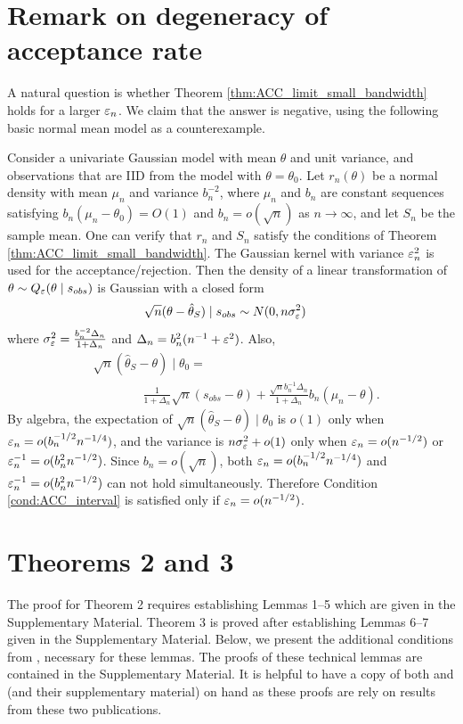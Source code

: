 \section{Remark on degeneracy of acceptance rate}\label{sec:degen_of_AR}
A natural question is whether Theorem \ref{thm:ACC_limit_small_bandwidth} holds for a larger $\varepsilon_n$. We claim that the answer is negative, using the following basic normal mean model as a counterexample.

Consider a univariate Gaussian model with mean $\theta$ and unit variance, and observations that are IID from the model with $\theta=\theta_0$. Let $r_{n}(\theta)$ be a normal density with mean $\mu_n$ and variance $b_n^{-2}$, where $\mu_n$ and $b_n$ are constant sequences satisfying $b_n(\mu_n-\theta_0)=O(1)$ and $b_n=o(\sqrt{n})$ as $n\rightarrow\infty$, and let $S_n$ be the sample mean. One can verify that $r_{n}$ and $S_n$ satisfy the conditions of Theorem \ref{thm:ACC_limit_small_bandwidth}. The Gaussian kernel with variance $\varepsilon_n^2$ is used for the acceptance/rejection. Then the density of a linear transformation of $\theta \sim Q_{\varepsilon}(\theta \mid s_{\relax obs})$ is Gaussian with a closed form  
\begin{align*}
\sqrt{n}(\theta-\hat{\theta}_{S}) \mid s_{obs} & \sim N(0,n\sigma_{\varepsilon}^{2})
\end{align*}
where $\sigma_{\varepsilon}^{2}=\frac{b_{n}^{-2}\Delta_{n}}{1+\Delta_{n}}$ and $\Delta_{n}=b_{n}^{2}(n^{-1}+\varepsilon^{2})$. Also,
\begin{align*}
&\sqrt{n}(\hat{\theta}_{S}-\theta) \mid \theta_0  = \qquad \qquad \qquad \qquad \qquad \qquad \\
&\qquad \qquad \frac{1}{1+\Delta_{n}}\sqrt{n}(s_{obs}-\theta)+\frac{\sqrt{n}b_{n}^{-1}\Delta_{n}}{1+\Delta_{n}}b_{n}(\mu_{n}-\theta).
\end{align*}
By algebra, the expectation of $\sqrt{n}(\hat{\theta}_{S}-\theta) \mid \theta_0$ is $o(1)$ only when $\varepsilon_n=o(b_{n}^{-1/2}n^{-1/4})$, and the variance is $n\sigma_{\varepsilon}^2+o(1)$ only when $\varepsilon_n=o(n^{-1/2})$ or $\varepsilon_n^{-1}=o(b_n^2n^{-1/2})$. Since $b_n=o(\sqrt{n})$, both $\varepsilon_n=o(b_{n}^{-1/2}n^{-1/4})$ and $\varepsilon_n^{-1}=o(b_n^2n^{-1/2})$ can not hold simultaneously. Therefore Condition \ref{cond:ACC_interval} is satisfied only if $\varepsilon_n=o(n^{-1/2})$.
	
\section{Theorems 2 and 3} \label{Appendix:Thm2and3}
The proof for Theorem 2 requires establishing Lemmas 1--5 which are given in the Supplementary Material. 
Theorem 3 is proved after establishing Lemmas 6--7 given in the Supplementary Material. 
Below, we present the additional conditions from \cite{Li2017}, necessary for these lemmas. The proofs of these technical lemmas are contained in the Supplementary Material. It is helpful to have a copy of both \cite{Li2016} and \cite{Li2017} (and their supplementary material) on hand as these proofs are rely on results from these two publications. 


